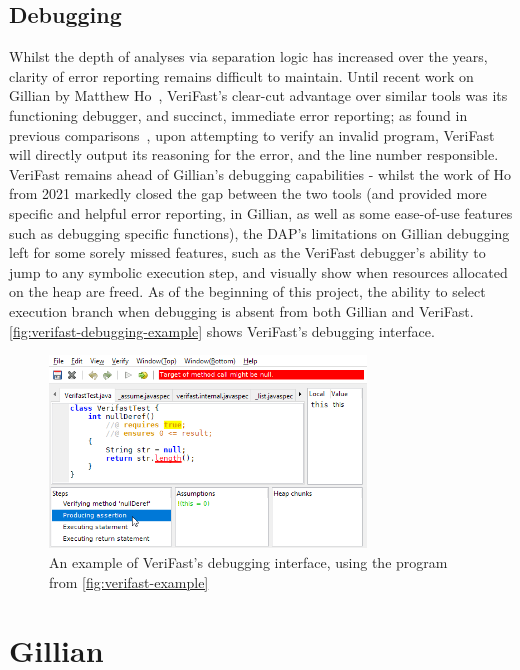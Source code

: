 \subsection{Debugging}

Whilst the depth of analyses via separation logic has increased over the years,
clarity of error reporting remains difficult to maintain. Until recent work on
Gillian by Matthew Ho~\cite{gillian-debugging-2021}, VeriFast's clear-cut
advantage over similar tools was its functioning debugger, and succinct,
immediate error reporting; as found in previous
comparisons~\cite{gillian-logging-2020}, upon attempting to verify an invalid
program, VeriFast will directly output its reasoning for the error, and the line
number responsible. VeriFast remains ahead of Gillian's debugging capabilities -
whilst the work of Ho from 2021 markedly closed the gap between the two tools
(and provided more specific and helpful error reporting, in Gillian, as well as
some ease-of-use features such as debugging specific functions), the DAP's
limitations on Gillian debugging left for some sorely missed features, such as
the VeriFast debugger's ability to jump to any symbolic execution step, and
visually show when resources allocated on the heap are freed. As of the
beginning of this project, the ability to select execution branch when debugging
is absent from both Gillian and VeriFast.
\autoref{fig:verifast-debugging-example} shows VeriFast's debugging interface.

\begin{figure}
  \centering
  \includegraphics[width=0.75\textwidth]{img/verifast-debugging-example.png}
  \caption{
    An example of VeriFast's debugging interface, using the program from
    \autoref{fig:verifast-example}
  }
  \label{fig:verifast-debugging-example}
\end{figure}


\section{Gillian}

